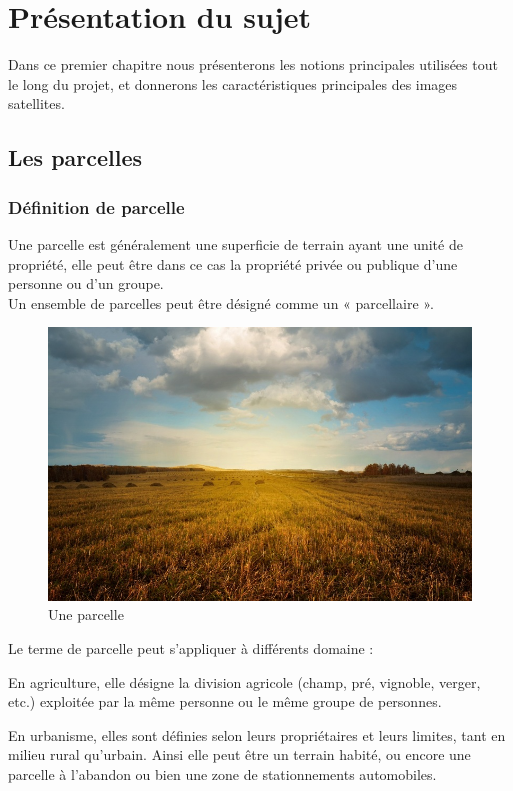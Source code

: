 \documentclass[12pt, openany]{report}
\begin{document}
\chapter{Présentation du sujet}


Dans ce premier chapitre nous présenterons les notions principales utilisées tout le long du projet, et donnerons les caractéristiques principales des images satellites.


\newpage
\section{Les parcelles}

\subsection{Définition de parcelle}
Une parcelle est généralement une superficie de terrain ayant une unité de propriété, elle peut être dans ce cas la propriété privée ou publique d'une personne ou d'un groupe.\\
Un ensemble de parcelles peut être désigné comme un « parcellaire ». 

\begin{figure}[H]
\centering
\includegraphics[scale=0.4]{parcelle2.jpg}
\caption{Une parcelle}
\end{figure}


Le terme de parcelle peut s'appliquer à différents domaine :

\begin{mylist}

\item En agriculture, elle désigne la division agricole (champ, pré, vignoble, verger, etc.) exploitée par la même personne ou le même groupe de personnes.


\item En urbanisme, elles sont définies selon leurs propriétaires et leurs limites, tant en milieu rural qu'urbain. Ainsi elle peut être un terrain habité, ou encore une parcelle à l'abandon ou bien une zone de stationnements automobiles. 

\end{mylist}
\end{document}
